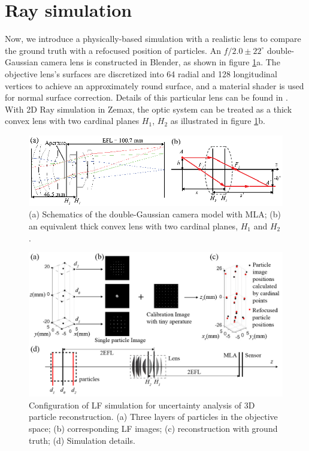\documentclass[draftthesis,fullpage]{uiucthesis}
\begin{document}
\section*{Ray simulation}\label{sec:simulation}
Now, we introduce a physically-based simulation \citep{michels2018simulation} with a realistic lens to compare the ground truth with a refocused position of particles. An $f/2.0\pm 22^{\circ}$ double-Gaussian camera lens is constructed in Blender, as shown in figure \ref{fig:simulate_lens}a. The objective lens's surfaces are discretized into 64 radial and 128 longitudinal vertices to achieve an approximately round surface, and a material shader is used for normal surface correction. Details of this particular lens can be found in \citet{smith2005modern}. With 2D Ray simulation in Zemax, the optic system can be treated as a thick convex lens with two cardinal planes $H_1$, $H_2$ as illustrated in figure \ref{fig:simulate_lens}b. 
\begin{figure}[h]
       \centerline{\includegraphics[width = 0.8\linewidth]{fig/figure4.eps}} 
        \caption{(a) Schematics of the double-Gaussian camera model with MLA;  (b) an equivalent thick convex lens with two cardinal planes, $H_1$ and $H_2$.}
      \label{fig:simulate_lens}
\end{figure}
\begin{figure}[h]
       \centerline{\includegraphics[width=0.8\linewidth]{fig/figure5.jpg}}
       \caption{Configuration of LF simulation for uncertainty analysis of 3D particle reconstruction. (a) Three layers of particles in the objective space; (b) corresponding LF images; (c) reconstruction with ground truth; (d) Simulation details.}
       \label{fig:simu}
\end{figure}
\end{document}
